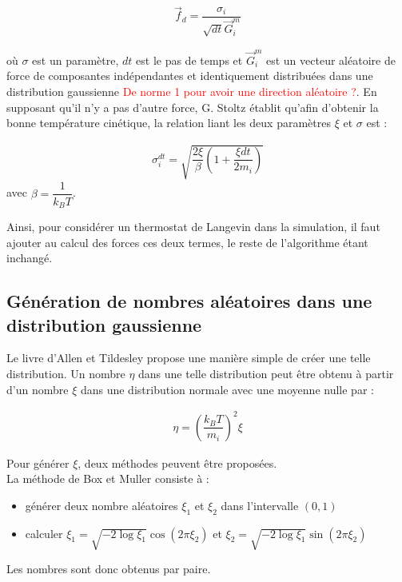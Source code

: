 \documentclass[12pt]{article}
\begin{document}
\begin{eqnarray}
\vec{f}_d=\dfrac{\sigma_i}{\sqrt{dt}\vec{G}^m_i}
\end{eqnarray}

où $\sigma$ est un paramètre, $dt$ est le pas de temps et $\vec{G}^m_i$ est un vecteur aléatoire de force de composantes indépendantes et identiquement distribuées dans une distribution gaussienne \textcolor{red}{De norme 1 pour avoir une direction aléatoire ?}. En supposant qu'il n'y a pas d'autre force, G. Stoltz \cite{sotltz} établit qu'afin d'obtenir la bonne température cinétique, la relation liant les deux paramètres $\xi$ et $\sigma$ est :

\begin{eqnarray}
\sigma_i^{dt}=\sqrt{\dfrac{2\xi}{\beta}\left(1+\dfrac{\xi dt}{2m_i}\right)}
\end{eqnarray}
avec $\beta=\dfrac{1}{k_B T}$.

Ainsi, pour considérer un thermostat de Langevin dans la simulation, il faut ajouter au calcul des forces ces deux termes, le reste de l'algorithme étant inchangé.

\subsection{Génération de nombres aléatoires dans une distribution gaussienne}

Le livre d'Allen et Tildesley \cite{allentildesley} propose une manière simple de créer une telle distribution. Un nombre $\eta$ dans une telle distribution peut être obtenu à partir d'un nombre $\xi$ dans une distribution normale avec une moyenne nulle par :

\begin{eqnarray}
\eta=\left(\dfrac{k_B T}{m_i}\right)^2 \xi
\end{eqnarray}

Pour générer $\xi$, deux méthodes peuvent être proposées.
\\

La méthode de Box et Muller \cite{allentildesley} consiste à :
\begin{itemize}
\item générer deux nombre aléatoires $\xi_1$ et $\xi_2$ dans l'intervalle $\left(0,1\right)$
\item calculer $\xi_1=\sqrt{-2 \log \xi_1}\cos\left(2\pi \xi_2\right)$ et $\xi_2=\sqrt{-2 \log \xi_1} \sin\left(2\pi \xi_2\right)$
\end{itemize}
Les nombres sont donc obtenus par paire.
\\
\end{document}
